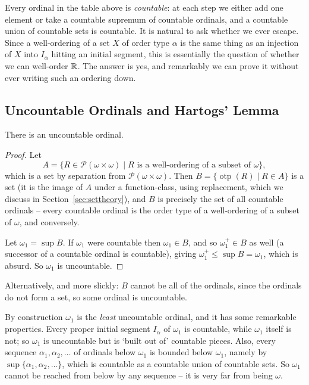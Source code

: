 \documentclass[a4paper]{scrartcl}
\newcommand{\otp}{\operatorname{otp}}
\begin{document}
Every ordinal in the table above is \emph{countable}: at each step we either add one element or take a countable supremum of countable ordinals, and a countable union of countable sets is countable. It is natural to ask whether we ever escape. Since a well-ordering of a set $X$ of order type $\alpha$ is the same thing as an injection of $X$ into $I_\alpha$ hitting an initial segment, this is essentially the question of whether we can well-order $\mathbb{R}$. The answer is yes, and remarkably we can prove it without ever writing such an ordering down.

\subsection{Uncountable Ordinals and Hartogs' Lemma}

\begin{theorem}\label{thm:omega1}
  There is an uncountable ordinal.
\end{theorem}
\begin{proof}
  Let
  $$A = \{R \in \mathcal{P}(\omega \times \omega) \mid R \text{ is a well-ordering of a subset of } \omega\},$$
  which is a set by separation from $\mathcal{P}(\omega\times\omega)$. Then $B = \{\otp(R) \mid R \in A\}$ is a set (it is the image of $A$ under a function-class, using replacement, which we discuss in Section~\ref{sec:settheory}), and $B$ is precisely the set of all countable ordinals -- every countable ordinal is the order type of a well-ordering of a subset of $\omega$, and conversely.

  Let $\omega_1 = \sup B$. If $\omega_1$ were countable then $\omega_1 \in B$, and so $\omega_1^+ \in B$ as well (a successor of a countable ordinal is countable), giving $\omega_1^+ \leq \sup B = \omega_1$, which is absurd. So $\omega_1$ is uncountable.
\end{proof}

Alternatively, and more slickly: $B$ cannot be all of the ordinals, since the ordinals do not form a set, so some ordinal is uncountable.

By construction $\omega_1$ is the \emph{least} uncountable ordinal, and it has some remarkable properties. Every proper initial segment $I_\alpha$ of $\omega_1$ is countable, while $\omega_1$ itself is not; so $\omega_1$ is uncountable but is `built out of' countable pieces. Also, every sequence $\alpha_1, \alpha_2, \dots$ of ordinals below $\omega_1$ is bounded below $\omega_1$, namely by $\sup\{\alpha_1, \alpha_2, \dots\}$, which is countable as a countable union of countable sets. So $\omega_1$ cannot be reached from below by any sequence -- it is very far from being $\omega$.
\end{document}

